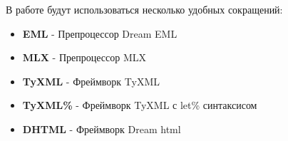 В работе будут использоваться несколько удобных сокращений:

\begin{itemize}
    \item \textbf{EML} - Препроцессор Dream EML
    \item \textbf{MLX} - Препроцессор MLX
    \item \textbf{TyXML} - Фреймворк TyXML
    \item \textbf{TyXML\%} - Фреймворк TyXML с let\% синтаксисом
    \item \textbf{DHTML} - Фреймворк Dream html
\end{itemize}
